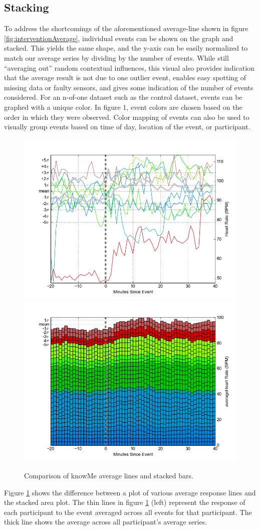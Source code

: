 \documentclass[review,journal]{vgtc}         %
\begin{document}
\subsection{Stacking}
To address the shortcomings of the aforementioned average-line shown in figure \ref{fig:interventionAverage}, individual events can be shown on the graph and stacked.
This yields the same shape, and the y-axis can be easily normalized to match our average series by dividing by the number of events.
While still “averaging out” random contextual influences, this visual also provides indication that the average result is not due to one outlier event, enables easy spotting of missing data or faulty sensors, and gives some indication of the number of events considered.
For an n-of-one dataset such as the control dataset, events can be graphed with a unique color.
In figure 1, event colors are chosen based on the order in which they were observed.
Color mapping of events can also be used to visually group events based on time of day, location of the event, or participant.

\begin{figure}
\centering
\includegraphics[width=0.45\columnwidth]{./img/knowMe_60m_lines.png}
\includegraphics[width=0.45\columnwidth]{./img/knowMe_60m_bars.png}
\caption{Comparison of knowMe average lines and stacked bars.}
\label{fig:knowMeCompare}
\end{figure}

Figure \ref{fig:knowMeCompare} shows the difference between a plot of various average response lines and the stacked area plot.
The thin lines in figure \ref{fig:knowMeCompare} (left) represent the response of each participant to the event averaged across all events for that participant.
The thick line shows the average across all participant’s average series.
\end{document}
